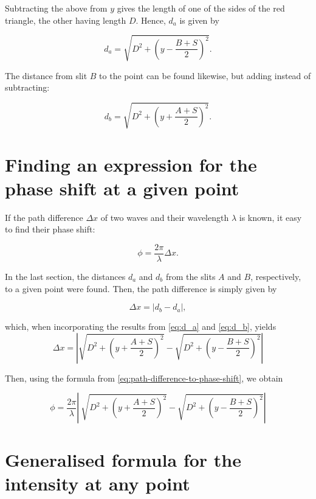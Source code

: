 \documentclass{paper}
\newcommand{\daformula}[0]{\sqrt{D^2 + \left(y - \frac{B + S}{2}\right)^2}}
\newcommand{\dbformula}[0]{\sqrt{D^2 + \left(y + \frac{A + S}{2}\right)^2}}
\begin{document}
Subtracting the above from $y$ gives the length of one of the sides of the red triangle, the other
having length $D$. Hence, $d_a$ is given by 

\begin{equation}
    \label{eq:d_a}
    d_a = \daformula.
\end{equation}

The distance from slit $B$ to the point can be found likewise, but adding instead of subtracting:
            
\begin{equation}
    \label{eq:d_b}
    d_b = \dbformula.
\end{equation}
            
\section{Finding an expression for the phase shift at a given point}

If the path difference $\Delta{x}$ of two waves and their wavelength $\lambda$ is known, it easy to find their
phase shift:
            
\begin{equation}
    \label{eq:path-difference-to-phase-shift}
    \phi = \frac{2\pi}{\lambda}\Delta{x}.
\end{equation}
            
In the last section, the distances $d_a$ and $d_b$ from the slits $A$ and $B$, respectively,
to a given point were found. Then, the path difference is simply given by
            
\begin{equation*}
    \Delta{x} = \lvert{}d_b - d_a\rvert{},
\end{equation*}
            
which, when incorporating the results from \eqref{eq:d_a} and \eqref{eq:d_b}, yields
\begin{equation*}
    \Delta{x} = \left\lvert \dbformula - \daformula \right\rvert
\end{equation*}
            
Then, using the formula from \eqref{eq:path-difference-to-phase-shift}, we obtain
            
\begin{equation}
    \label{eq:phase-shift}
    \phi = \frac{2\pi}{\lambda}\left\lvert\ \dbformula - \daformula \right\rvert
\end{equation}
            
\section{Generalised formula for the intensity at any point}
\label{section:intensity-formula}
\end{document}
